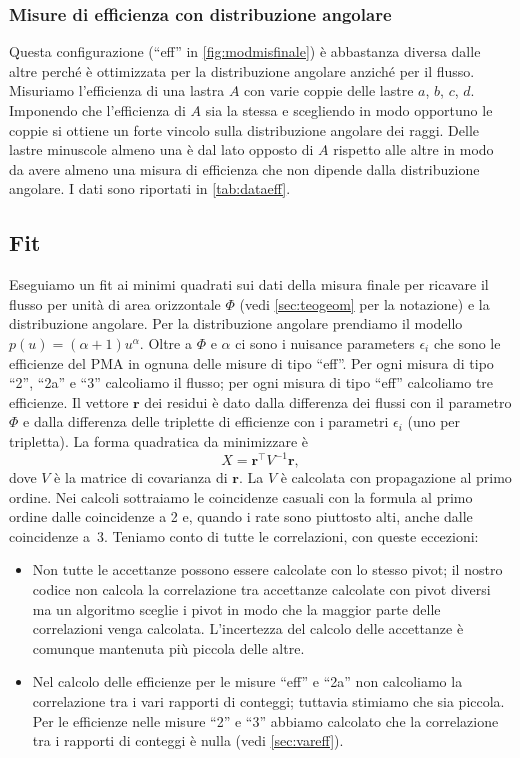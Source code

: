 \subsubsection{Misure di efficienza con distribuzione angolare}

Questa configurazione (``eff'' in \autoref{fig:modmisfinale})
è abbastanza diversa dalle altre perché è ottimizzata per la distribuzione angolare anziché per il flusso.
Misuriamo l'efficienza di una lastra $A$ con varie coppie delle lastre $a$, $b$, $c$, $d$.
Imponendo che l'efficienza di $A$ sia la stessa e scegliendo in modo opportuno le coppie
si ottiene un forte vincolo sulla distribuzione angolare dei raggi.
Delle lastre minuscole almeno una è dal lato opposto di $A$ rispetto alle altre in modo
da avere almeno una misura di efficienza che non dipende dalla distribuzione angolare.
I dati sono riportati in \autoref{tab:dataeff}.

\subsection{Fit}

Eseguiamo un fit ai minimi quadrati sui dati della misura finale
per ricavare il flusso per unità di area orizzontale $\Phi$
(vedi \autoref{sec:teogeom} per la notazione) e la distribuzione angolare.
Per la distribuzione angolare prendiamo il modello $p(u) = (\alpha+1) u^\alpha$.
Oltre a $\Phi$ e $\alpha$ ci sono i nuisance parameters $\epsilon_i$
che sono le efficienze del PMA in ognuna delle misure di tipo ``eff''.
Per ogni misura di tipo ``2'', ``2a'' e ``3'' calcoliamo il flusso;
per ogni misura di tipo ``eff'' calcoliamo tre efficienze.
Il vettore $\mathbf r$ dei residui è dato dalla differenza dei flussi con il parametro $\Phi$
e dalla differenza delle triplette di efficienze con i parametri $\epsilon_i$ (uno per tripletta).
La forma quadratica da minimizzare è
\begin{equation*}
	X = \mathbf r^\top V^{-1} \mathbf r,
\end{equation*}
dove $V$ è la matrice di covarianza di $\mathbf r$.
La $V$ è calcolata con propagazione al primo ordine.
Nei calcoli sottraiamo le coincidenze casuali con la formula al primo ordine
dalle coincidenze a 2 e, quando i rate sono piuttosto alti, anche dalle coincidenze a~3.
Teniamo conto di tutte le correlazioni, con queste eccezioni:
\begin{itemize}
	\item Non tutte le accettanze possono essere calcolate con lo stesso pivot;
	il nostro codice non calcola la correlazione tra accettanze calcolate con pivot diversi
	ma un algoritmo sceglie i pivot in modo che la maggior parte delle correlazioni venga calcolata.
	L'incertezza del calcolo delle accettanze è comunque mantenuta più piccola delle altre.
	\item Nel calcolo delle efficienze per le misure ``eff'' e ``2a''
	non calcoliamo la correlazione tra i vari rapporti di conteggi;
	tuttavia stimiamo che sia piccola.
	Per le efficienze nelle misure ``2'' e ``3'' abbiamo calcolato
	che la correlazione tra i rapporti di conteggi è nulla
	(vedi \autoref{sec:vareff}).
\end{itemize}

